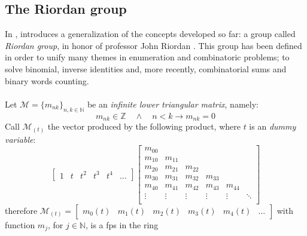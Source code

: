 
\subsection{The Riordan group}

In \cite{shapiro:1991}, \citeauthor{shapiro:1991} introduces a
generalization of the concepts developed so far: a group called 
\emph{Riordan group}, in honor of professor John Riordan
.
This group has been defined in order to unify many themes in 
enumeration and combinatoric problems; to solve binomial, 
inverse identities and, more recently, combinatorial
sums and binary words counting. 
\\\\
Let $\mathcal{M}=\lbrace m_{nk}\rbrace_{n,k\in\mathbb{N}}$ be an \emph{infinite
lower triangular matrix}, namely:
\begin{displaymath}
     m_{nk}\in\mathbb{Z} \quad\wedge\quad n < k \rightarrow m_{nk} = 0
\end{displaymath}
Call $\mathcal{M}_{(t)}$ the vector produced by the following product, 
where $t$ is an \emph{dummy variable}:
\begin{displaymath}
    \left[
        \begin{array}{cccccc}
            1 & t & t^{2} & t^{3} & t^{4} &\ldots
        \end{array}
    \right]
    \left[
        \begin{array}{cccccc}
            m_{00} & & & &  &\\
            m_{10} & m_{11} & & &  &\\
            m_{20} & m_{21}& m_{22}& &  &\\
            m_{30} & m_{31}& m_{32}& m_{33}&  &\\
            m_{40} & m_{41}& m_{42}& m_{43}& m_{44} &\\
            \vdots & \vdots& \vdots& \vdots& \vdots & \ddots\\
        \end{array}
    \right]
\end{displaymath}
therefore $\mathcal{M}_{(t)} =
    \left[
        \begin{array}{cccccc}
            m_{0}(t) & m_{1}(t) & m_{2}(t) & m_{3}(t) &m_{4}(t) & \ldots
        \end{array}
    \right]$ 
with function $m_{j}$, for $j\in\mathbb{N}$, is a \ac{fps} in the ring 
